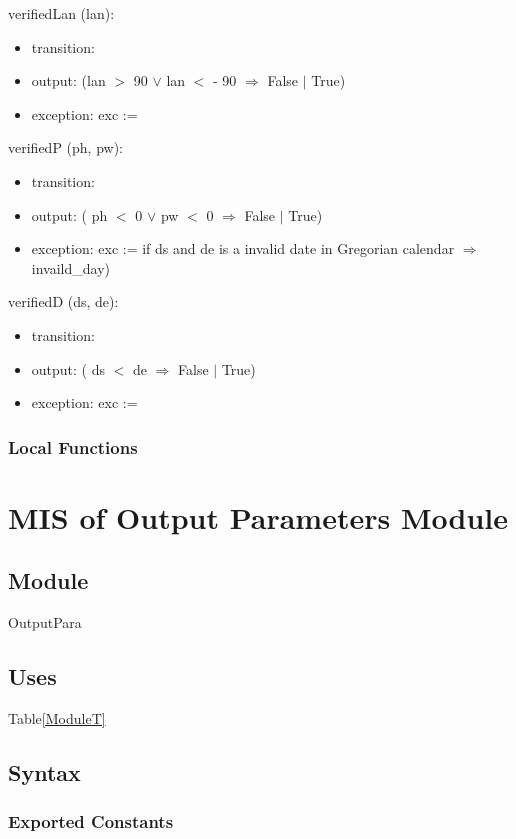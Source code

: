 \documentclass[12pt, titlepage]{article}
\begin{document}
\noindent  verifiedLan (lan):
\begin{itemize}
\item transition: 
\item output: (lan $>$ 90 $\lor$ lan $<$ - 90 $\Rightarrow$ False $|$ True)
\item exception: exc := 
\end{itemize}

\noindent  verifiedP (ph, pw):
\begin{itemize}
\item transition: 
\item output: ( ph $<$ 0 $\lor$ pw $<$ 0 $\Rightarrow$ False $|$ True)
\item exception: exc := 
if ds and de is a invalid date in Gregorian calendar $\Rightarrow$ invaild\_day)
\end{itemize}

\noindent  verifiedD (ds, de):
\begin{itemize}
\item transition: 
\item output: ( ds $<$ de $\Rightarrow$ False $|$ True)
\item exception: exc := 
\end{itemize}

\subsubsection{Local Functions}

\section{MIS of Output Parameters Module} \label{ModuleOP} 

\subsection{Module}
OutputPara

\subsection{Uses}
Table\ref{ModuleT}\\

\subsection{Syntax}

\subsubsection{Exported Constants}
\end{document}
